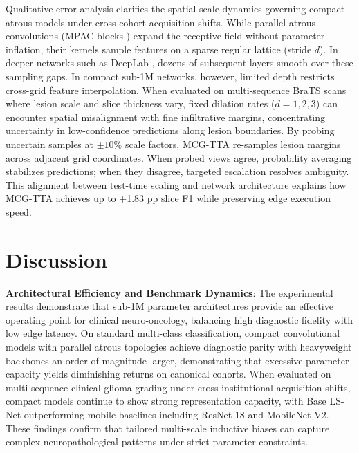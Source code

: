 \documentclass[journal]{IEEEtran}
\begin{document}
Qualitative error analysis clarifies the spatial scale dynamics governing compact atrous models under cross-cohort acquisition shifts. While parallel atrous convolutions (MPAC blocks \cite{16}) expand the receptive field without parameter inflation, their kernels sample features on a sparse regular lattice (stride $d$). In deeper networks such as DeepLab \cite{5}, dozens of subsequent layers smooth over these sampling gaps. In compact sub-1M networks, however, limited depth restricts cross-grid feature interpolation. When evaluated on multi-sequence BraTS scans where lesion scale and slice thickness vary, fixed dilation rates ($d=1, 2, 3$) can encounter spatial misalignment with fine infiltrative margins, concentrating uncertainty in low-confidence predictions along lesion boundaries. By probing uncertain samples at $\pm 10\%$ scale factors, MCG-TTA re-samples lesion margins across adjacent grid coordinates. When probed views agree, probability averaging stabilizes predictions; when they disagree, targeted escalation resolves ambiguity. This alignment between test-time scaling and network architecture explains how MCG-TTA achieves up to +1.83 pp slice F1 while preserving edge execution speed.





\section{Discussion}

\noindent\textbf{Architectural Efficiency and Benchmark Dynamics}: The experimental results demonstrate that sub-1M parameter architectures provide an effective operating point for clinical neuro-oncology, balancing high diagnostic fidelity with low edge latency. On standard multi-class classification, compact convolutional models with parallel atrous topologies achieve diagnostic parity with heavyweight backbones an order of magnitude larger, demonstrating that excessive parameter capacity yields diminishing returns on canonical cohorts. When evaluated on multi-sequence clinical glioma grading under cross-institutional acquisition shifts, compact models continue to show strong representation capacity, with Base LS-Net outperforming mobile baselines including ResNet-18 and MobileNet-V2. These findings confirm that tailored multi-scale inductive biases can capture complex neuropathological patterns under strict parameter constraints.
\end{document}
